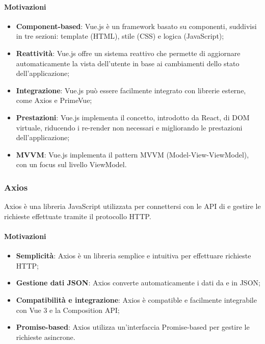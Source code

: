 \paragraph*{Motivazioni}
\begin{itemize}
  \item \textbf{Component-based}: Vue.js è un framework basato su componenti, suddivisi in tre sezioni: template (HTML), stile (CSS) e logica (JavaScript);
  \item \textbf{Reattività}: Vue.js offre un sistema reattivo che permette di aggiornare automaticamente la vista dell'utente in base ai cambiamenti dello stato dell'applicazione;
  \item \textbf{Integrazione}: Vue.js può essere facilmente integrato con librerie esterne, come Axios e PrimeVue;
  \item \textbf{Prestazioni}: Vue.js implementa il concetto, introdotto da React, di DOM virtuale, riducendo i re-render non necessari e migliorando le prestazioni dell'applicazione;
  \item \textbf{MVVM}: Vue.js implementa il pattern MVVM (Model-View-ViewModel), con un focus sul livello ViewModel.
\end{itemize}

\subsubsection{Axios}\label{sec:axios}
\par Axios è una libreria JavaScript utilizzata per connettersi con le API di  e gestire le richieste effettuate tramite il protocollo HTTP.
\paragraph*{Motivazioni}
\begin{itemize}
  \item \textbf{Semplicità}: Axios è un libreria semplice e intuitiva per effettuare richieste HTTP;
  \item \textbf{Gestione dati JSON}: Axios converte automaticamente i dati da e in JSON;
  \item \textbf{Compatibilità e integrazione}: Axios è compatible e facilmente integrabile con Vue 3 e la Composition API;
  \item \textbf{Promise-based}: Axios utilizza un'interfaccia Promise-based per gestire le richieste asincrone.
\end{itemize}

